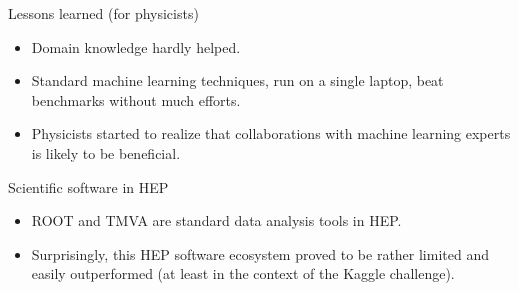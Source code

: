 \documentclass{beamer}
\begin{document}
\begin{frame}{Lessons learned (for physicists)}

\begin{itemize}
\item Domain knowledge hardly helped.

\vspace{0.25cm}

\item Standard machine learning techniques, run on a single laptop, beat benchmarks without much efforts.

\vspace{0.25cm}

\item Physicists started to realize that {\color{blue} collaborations with machine learning experts
    is likely to be beneficial}.


\end{itemize}
\end{frame}


\begin{frame}{Scientific software in HEP}

\begin{itemize}
    \item ROOT and TMVA are standard data analysis tools in HEP.

    \vspace{0.5cm}

    \item Surprisingly, this {\color{red} HEP software ecosystem proved to be rather limited
          and easily outperformed} (at least in the context of the Kaggle challenge).


\end{itemize}

\end{frame}
\end{document}
